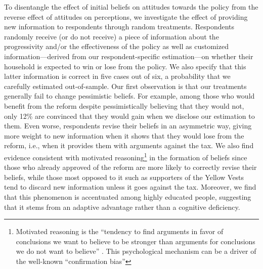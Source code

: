 \documentclass[12pt]{article} %
\begin{document}
To disentangle the effect of initial beliefs on attitudes towards the policy from the reverse effect of attitudes on perceptions, we investigate the effect of providing new information to respondents through random treatments. Respondents randomly receive (or do not receive) a piece of information about the progressivity and/or the effectiveness of the policy as well as customized information---derived from our respondent-specific estimation---on whether their household is expected to win or lose from the policy. We also specify that this latter information is correct in five cases out of six, a probability that we carefully estimated out-of-sample. Our first observation is that our treatments generally fail to change pessimistic beliefs. For example, among those who would benefit from the reform despite pessimistically believing that they would not, only 12\% are convinced that they would gain when we disclose our estimation to them. Even worse, respondents revise their beliefs in an asymmetric way, giving more weight to new information when it shows that they would lose from the reform, i.e., when it provides them with arguments against the tax. We also find evidence consistent with motivated reasoning\footnote{Motivated reasoning is the ``tendency to find arguments in favor of conclusions we want to believe to be stronger than arguments for conclusions we do not want to believe'' \citep{ziva_kunda_case_1990}. This psychological mechanism can be a driver of the well-known ``confirmation bias''} in the formation of beliefs since those who already approved of the reform are more likely to correctly revise their beliefs, while those most opposed to it such as supporters of the Yellow Vests tend to discard new information unless it goes against the tax. Moreover, we find that this phenomenon is accentuated among highly educated people, suggesting that it stems from an adaptive advantage rather than a cognitive deficiency.
\end{document}
